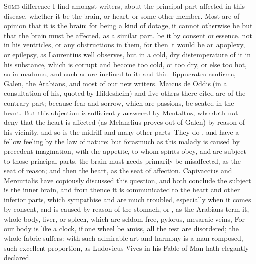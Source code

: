 \lettrine{S}{ome} difference I find amongst writers, about the principal part
affected in this disease, whether it be the brain, or heart, or some other
member. Most are of opinion that it is the brain: for being a kind of dotage,
it cannot otherwise be but that the brain must be affected, as a similar part,
be it by consent or essence, not in his ventricles, or any
obstructions in them, for then it would be an apoplexy, or epilepsy, as
Laurentius well observes, but in a cold, dry
distemperature of it in his substance, which is corrupt and become too cold, or
too dry, or else too hot, as in madmen, and such as are inclined to it: and
this Hippocrates confirms, Galen, the Arabians, and most
of our new writers. Marcus de Oddis (in a consultation of his, quoted by
Hildesheim) and five others there cited are of the
contrary part; because fear and sorrow, which are passions, be seated in the
heart. But this objection is sufficiently answered by
Montaltus, who doth not deny that the heart is affected
(as Melanelius proves out of Galen) by reason of his
vicinity, and so is the midriff and many other parts. They do , and
have a fellow feeling by the law of nature: but forasmuch as this malady is
caused by precedent imagination, with the appetite, to whom spirits obey, and
are subject to those principal parts, the brain must needs primarily be
misaffected, as the seat of reason; and then the heart, as the seat of
affection. Capivaccius and Mercurialis have copiously
discussed this question, and both conclude the subject is the inner brain, and
from thence it is communicated to the heart and other inferior parts, which
sympathise and are much troubled, especially when it comes by consent, and is
caused by reason of the stomach, or , as the Arabians term it, whole
body, liver, or spleen, which are seldom free, pylorus,
mesaraic veins, \etc{} For our body is like a clock, if one wheel be amiss, all
the rest are disordered; the whole fabric suffers: with such admirable art and
harmony is a man composed, such excellent proportion, as Ludovicus Vives in his
Fable of Man hath elegantly declared.

